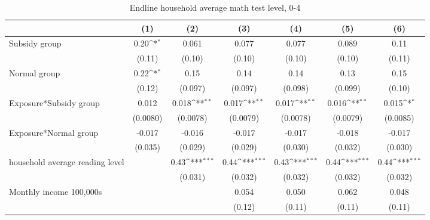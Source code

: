 \begin{table}[htbp]\centering
\def\sym#1{\ifmmode^{#1}\else\(^{#1}\)\fi}
\caption{Endline household average math test level, 0-4}
\begin{tabular*}{1\hsize}{@{\hskip\tabcolsep\extracolsep\fill}l*{6}{c}}
\toprule
                &\multicolumn{1}{c}{(1)}         &\multicolumn{1}{c}{(2)}         &\multicolumn{1}{c}{(3)}         &\multicolumn{1}{c}{(4)}         &\multicolumn{1}{c}{(5)}         &\multicolumn{1}{c}{(6)}         \\
\midrule
Subsidy group   &     0.20\sym{*}  &    0.061         &    0.077         &    0.077         &    0.089         &     0.11         \\
                &   (0.11)         &   (0.10)         &   (0.10)         &   (0.10)         &   (0.10)         &   (0.11)         \\
Normal group    &     0.22\sym{*}  &     0.15         &     0.14         &     0.14         &     0.13         &     0.15         \\
                &   (0.12)         &  (0.097)         &  (0.097)         &  (0.098)         &  (0.099)         &   (0.10)         \\
Exposure*Subsidy group&    0.012         &    0.018\sym{**} &    0.017\sym{**} &    0.017\sym{**} &    0.016\sym{**} &    0.015\sym{*}  \\
                & (0.0080)         & (0.0078)         & (0.0079)         & (0.0078)         & (0.0079)         & (0.0085)         \\
Exposure*Normal group&   -0.017         &   -0.016         &   -0.017         &   -0.017         &   -0.018         &   -0.017         \\
                &  (0.035)         &  (0.029)         &  (0.029)         &  (0.030)         &  (0.032)         &  (0.030)         \\
household average reading level&                  &     0.43\sym{***}&     0.44\sym{***}&     0.43\sym{***}&     0.44\sym{***}&     0.44\sym{***}\\
                &                  &  (0.031)         &  (0.032)         &  (0.032)         &  (0.032)         &  (0.032)         \\
Monthly income 100,000s&                  &                  &    0.054         &    0.050         &    0.062         &    0.048         \\
                &                  &                  &   (0.12)         &   (0.11)         &   (0.11)         &   (0.11)         \\

\end{tabular*}
\end{table}
